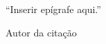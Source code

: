 \chapter*{}

\vspace*{\fill}

\begin{flushright}

\begin{minipage}{0.45\textwidth}
\begin{flushright}

``Inserir epígrafe aqui.''

\vspace{1cm}

Autor da citação

\end{flushright}
\end{minipage}

\end{flushright}

\vspace*{2cm}

\cleardoublepage